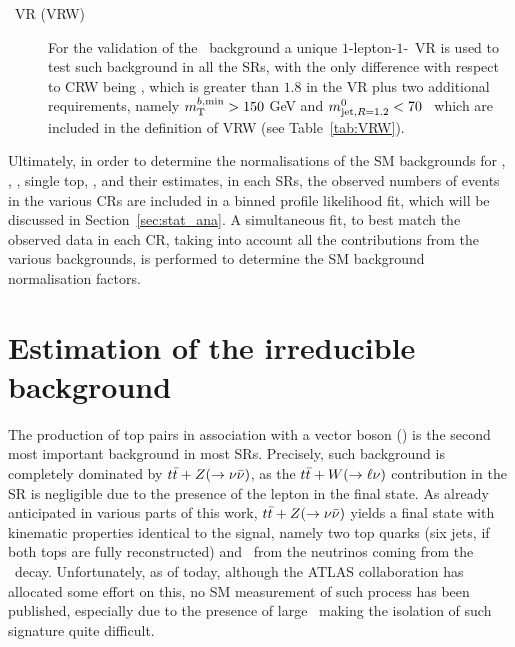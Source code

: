 \begin{description}
				\item [\Wjets\ VR (VRW)] For the validation of the \Wjets\ background a unique $1$-lepton-$1$-\bj\ \ac{VR} is used to test such background in all the \acp{SR}, with the only difference with respect to CRW being \mindrblep, which is greater than $1.8$ in the \ac{VR} plus two additional requirements, namely $m_{\mathrm{T}}^{b,\mathrm{min}}>150$ GeV and $m^{0}_{\mathrm{jet,}R=1.2}<70$ \GeV\ which are included in the definition of VRW (see Table~\ref{tab:VRW}).

			\end{description}

		Ultimately, in order to determine the normalisations of the \ac{SM} backgrounds for \Zboson, \ttbar, \Wboson, single top, \ttZ, and their estimates, in each \acp{SR}, the observed numbers of events in the various \acp{CR} are included in a binned profile likelihood fit, which will be discussed in Section~\ref{sec:stat_ana}. A simultaneous fit, to best match the observed data in each \ac{CR}, taking into account all the contributions from the various backgrounds, is performed to determine the \ac{SM} background normalisation factors. 


	\section{Estimation of the \protect{\ttZ} irreducible background}
	\label{sec:ddbkgest}

		The production of top pairs in association with a vector boson (\ttV) is the second most important background in most \acp{SR}. Precisely, such background is completely dominated by $t\bar{t}+Z(\rightarrow \nu\bar{\nu})$, as the $t\bar{t}+W(\rightarrow \ell \nu)$ contribution in the \ac{SR} is negligible due to the presence of the lepton in the final state. As already anticipated in various parts of this work, $t\bar{t}+Z(\rightarrow \nu\bar{\nu})$ yields a final state with kinematic properties identical to the signal, namely two top quarks (six jets, if both tops are fully reconstructed) and \met\ from the neutrinos coming from the \Zboson\ decay. Unfortunately, as of today, although the \ac{ATLAS} collaboration has allocated some effort on this, no \ac{SM} measurement of such process has been published, especially due to the presence of large \met\ making the isolation of such signature quite difficult.



